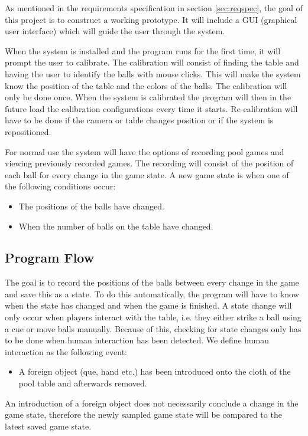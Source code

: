 As mentioned in the requirements specification in section \ref{sec:reqspec}, the goal of this project is to construct a working prototype. It will include a GUI (graphical user interface) which will guide the user through the system.

When the system is installed and the program runs for the first time, it will prompt the user to calibrate. The calibration will consist of finding the table and having the user to identify the balls with mouse clicks. This will make the system know the position of the table and the colors of the balls. The calibration will only be done once. When the system is calibrated the program will then in the future load the calibration configurations every time it starts. Re-calibration will have to be done if the camera or table changes position or if the system is repositioned.

For normal use the system will have the options of recording pool games and viewing previously recorded games. The recording will consist of the position of each ball for every change in the game state. A new game state is when one of the following conditions occur: 
\begin{itemize}
	\item The positions of the balls have changed.
	\item When the number of balls on the table have changed.
\end{itemize}

\subsection{Program Flow}
The goal is to record the positions of the balls between every change in the game and save this as a state. To do this automatically, the program will have to know when the state has changed and when the game is finished. A state change will only occur when players interact with the table, i.e. they either strike a ball using a cue or move balls manually. Because of this, checking for state changes only has to be done when human interaction has been detected. We define human interaction as the following event:
\begin{itemize}
	\item  A foreign object (que, hand etc.) has been introduced onto the cloth of the pool table and afterwards removed.
\end{itemize}

An introduction of a foreign object does not necessarily conclude a change in the game state, therefore the newly sampled game state will be compared to the latest saved game state.


